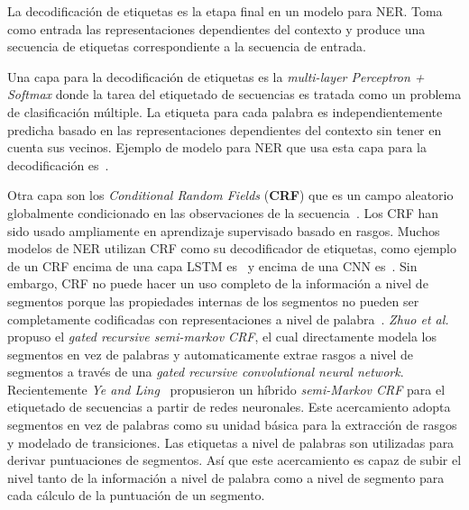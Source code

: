 La decodificaci\'on de etiquetas es la etapa final en un modelo para NER. Toma como entrada las representaciones dependientes del contexto y produce una secuencia de etiquetas correspondiente a la secuencia de entrada.

Una capa para la decodificaci\'on de etiquetas es la \emph{multi-layer Perceptron + Softmax} donde la tarea del etiquetado de secuencias es tratada como un problema de clasificaci\'on m\'ultiple. La etiqueta para cada palabra es independientemente predicha basado en las representaciones dependientes del contexto sin tener en cuenta sus vecinos. Ejemplo de modelo para NER que usa esta capa para la decodificaci\'on es~\cite{li2017leveraging}.


Otra capa son los \emph{Conditional Random Fields} (\textbf{CRF}) que es un campo aleatorio globalmente condicionado en las observaciones de la secuencia~\cite{lafferty2001conditional}. Los CRF han sido usado ampliamente en aprendizaje supervisado basado en rasgos. Muchos modelos de NER utilizan CRF como su decodificador de etiquetas, como ejemplo de un CRF encima de una capa LSTM es~\cite{peters2018deep} y encima de una CNN es~\cite{collobert2011natural}. Sin embargo, CRF no puede hacer un uso completo de la informaci\'on a nivel de segmentos porque las propiedades internas de los segmentos no pueden ser completamente codificadas con representaciones a nivel de palabra~\cite{li2018survey}. \emph{Zhuo et al.}~\cite{zhuo2016segment} propuso el \emph{gated recursive semi-markov CRF}, el cual directamente modela los segmentos en vez de palabras y automaticamente extrae rasgos a nivel de segmentos a trav\'es de una \emph{gated recursive convolutional neural network}. Recientemente \emph{Ye and Ling}~\cite{ye2018hybrid} propusieron un h\'ibrido \emph{semi-Markov CRF} para el etiquetado de secuencias a partir de redes neuronales. Este acercamiento adopta segmentos en vez de palabras como su unidad b\'asica para la extracci\'on de rasgos y modelado de transiciones. Las etiquetas a nivel de palabras son utilizadas para derivar puntuaciones de segmentos. As\'i que este acercamiento es capaz de subir el nivel tanto de la informaci\'on a nivel de palabra como a nivel de segmento para cada c\'alculo de la puntuaci\'on de un segmento.

